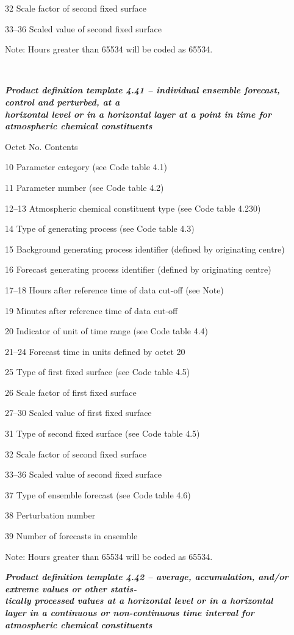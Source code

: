 32 Scale factor of second fixed surface

33--36 Scaled value of second fixed surface

Note: Hours greater than 65534 will be coded as 65534.

\emph{\textbf{\\
}}

\emph{\textbf{Product definition template 4.41 -- individual ensemble forecast, control and perturbed, at a\\
horizontal level or in a horizontal layer at a point in time for\\
atmospheric chemical constituents}}

Octet No. Contents

10 Parameter category (see Code table 4.1)

11 Parameter number (see Code table 4.2)

12--13 Atmospheric chemical constituent type (see Code table 4.230)

14 Type of generating process (see Code table 4.3)

15 Background generating process identifier (defined by originating centre)

16 Forecast generating process identifier (defined by originating centre)

17--18 Hours after reference time of data cut-off (see Note)

19 Minutes after reference time of data cut-off

20 Indicator of unit of time range (see Code table 4.4)

21--24 Forecast time in units defined by octet 20

25 Type of first fixed surface (see Code table 4.5)

26 Scale factor of first fixed surface

27--30 Scaled value of first fixed surface

31 Type of second fixed surface (see Code table 4.5)

32 Scale factor of second fixed surface

33--36 Scaled value of second fixed surface

37 Type of ensemble forecast (see Code table 4.6)

38 Perturbation number

39 Number of forecasts in ensemble

Note: Hours greater than 65534 will be coded as 65534.

\emph{\textbf{Product definition template 4.42 -- average, accumulation, and/or extreme values or other statis-\\
tically processed values at a horizontal level or in a horizontal\\
layer in a continuous or non-continuous time interval for\\
atmospheric chemical constituents}}

